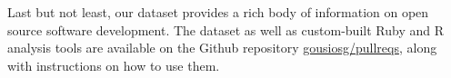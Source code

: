 \documentclass{sig-alternate}
\begin{document}
Last but not least, our dataset provides a rich body of information on open source software development. The dataset as well as custom-built Ruby and R analysis tools are available on the Github repository 
\href{https://github.com/gousiosg/pullreqs}{gousiosg/pullreqs}, along with instructions on how to use them.

%
%
%
%
%  
%
%
%
%
%
%



\balance
\begin{small}

  
\end{small}
\end{document}
